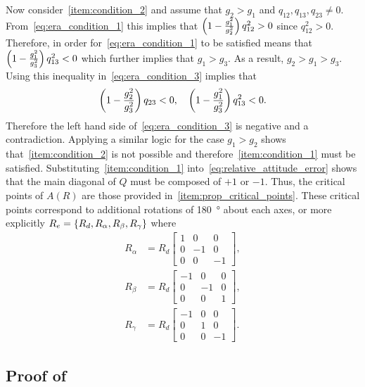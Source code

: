 Now consider~\cref{item:condition_2} and assume that \( g_2 > g_1 \) and \( q_{12}, q_{13}, q_{23} \neq 0 \).
From~\cref{eq:era_condition_1} this implies that \( \left( 1 - \frac{g_1^2}{g_2^2}  \right) q_{12}^2 > 0\) since \( q_{12}^2 > 0\).
Therefore, in order for~\cref{eq:era_condition_1} to be satisfied means that \( \left( 1 - \frac{g_1^2}{g_3^2}  \right) q_{13}^2 < 0 \) which further implies that \( g_1 > g_3 \).
As a result, \( g_2 > g_1 > g_3 \).
Using this inequality in~\cref{eq:era_condition_3} implies that
\begin{align*}
    \left( 1 - \frac{g_2^2}{g_3^2} \right) q_{23} < 0, \quad \left( 1 - \frac{g_1^2}{g_3^2} \right) q_{13}^2 < 0.
\end{align*}
Therefore the left hand side of~\cref{eq:era_condition_3} is negative and a contradiction.
Applying a similar logic for the case \( g_1 > g_2 \) shows that~\cref{item:condition_2} is not possible and therefore~\cref{item:condition_1} must be satisfied.
Substituting~\cref{item:condition_1} into~\cref{eq:relative_attitude_error} shows that the main diagonal of \( Q \) must be composed of \( + 1 \) or \( -1 \).
Thus, the critical points of \( A(R) \) are those provided in~\cref{item:prop_critical_points}.
These critical points correspond to additional rotations of \SI{180}{\degree} about each axes, or more explicitly \( R_e = \left\{ R_d, R_\alpha, R_\beta, R_\gamma \right\} \) where
\begin{align}
    R_\alpha &= R_d \begin{bmatrix} 1 & 0 & 0 \\ 0 & -1 & 0 \\ 0 & 0 & -1 \end{bmatrix} , \\
    R_\beta &= R_d \begin{bmatrix} -1 & 0 & 0 \\ 0 & -1 & 0 \\ 0 & 0 & 1 \end{bmatrix} , \\
    R_\gamma &= R_d \begin{bmatrix} -1 & 0 & 0 \\ 0 & 1 & 0 \\ 0 & 0 & -1 \end{bmatrix}.
\end{align}

\subsection{Proof of~}\label{proof:prop_psi_quadratic}

